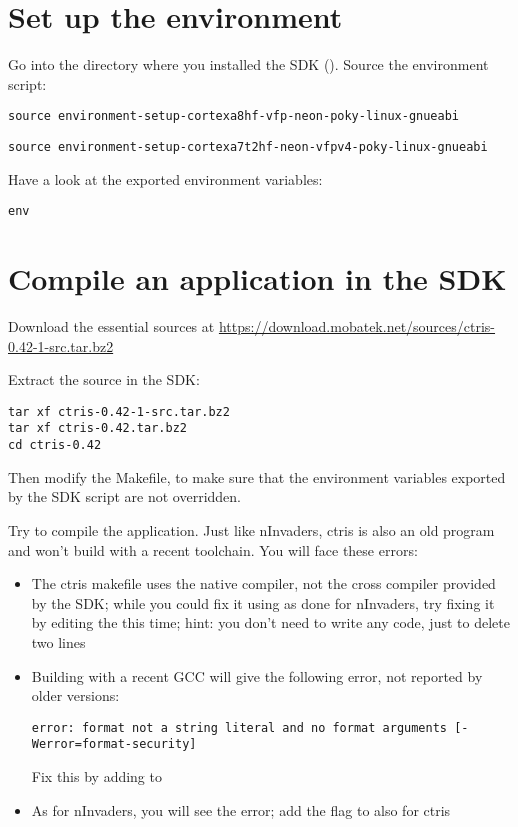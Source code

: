 \section{Set up the environment}

Go into the directory where you installed the SDK
(). Source the environment script:
\if{}
\begin{verbatim}
source environment-setup-cortexa8hf-vfp-neon-poky-linux-gnueabi
\end{verbatim}
\fi
\if{}
\begin{verbatim}
source environment-setup-cortexa7t2hf-neon-vfpv4-poky-linux-gnueabi
\end{verbatim}
\fi

Have a look at the exported environment variables:
\begin{verbatim}
env
\end{verbatim}

\section{Compile an application in the SDK}

Download the essential  sources at
\url{https://download.mobatek.net/sources/ctris-0.42-1-src.tar.bz2}

Extract the source in the SDK:
\begin{verbatim}
tar xf ctris-0.42-1-src.tar.bz2
tar xf ctris-0.42.tar.bz2
cd ctris-0.42
\end{verbatim}

Then modify the Makefile, to make sure that the environment variables exported
by the SDK script are not overridden.

Try to compile the application. Just like nInvaders, ctris is also an old
program and won't build with a recent toolchain. You will face these
errors:

\begin{itemize}
  \item The ctris makefile uses the native compiler, not the cross compiler
  provided by the SDK; while you could fix it using  as done
  for nInvaders, try fixing it by editing the  this time;
  hint: you don't need to write any code, just to delete two lines

  \item Building with a recent GCC will give the following error, not
  reported by older versions:
\begin{verbatim}
error: format not a string literal and no format arguments [-Werror=format-security]
\end{verbatim}
  Fix this by adding  to 

  \item As for nInvaders, you will see the 
  error; add the  flag to  also for ctris

\end{itemize}

